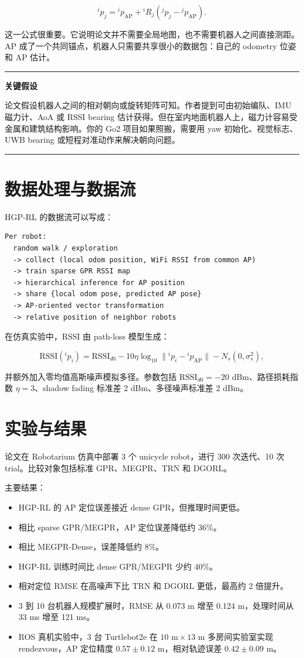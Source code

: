 \documentclass[UTF8,a4paper,12pt]{ctexrep}
\newenvironment{warnbox}[1]
{\begin{center}\begin{minipage}{0.94\linewidth}\color{deeporange}\hrule\vspace{0.6em}\textbf{#1}\par\vspace{0.4em}\color{black}}
{\vspace{0.4em}\hrule\end{minipage}\end{center}}
\begin{document}
\[
{}^{i}p_j
=
{}^{i}p_{\mathrm{AP}}
+{}^{i}R_j({}^{j}p_j-{}^{j}p_{\mathrm{AP}}).
\]

这一公式很重要。它说明论文并不需要全局地图，也不需要机器人之间直接测距。AP 成了一个共同锚点，机器人只需要共享很小的数据包：自己的 odometry 位姿和 AP 估计。

\begin{warnbox}{关键假设}
论文假设机器人之间的相对朝向或旋转矩阵可知。作者提到可由初始编队、IMU 磁力计、AoA 或 RSSI bearing 估计获得。但在室内地面机器人上，磁力计容易受金属和建筑结构影响。你的 Go2 项目如果照搬，需要用 yaw 初始化、视觉标志、UWB bearing 或短程对准动作来解决朝向问题。
\end{warnbox}

\section{数据处理与数据流}

HGP-RL 的数据流可以写成：

\begin{lstlisting}
Per robot:
  random walk / exploration
  -> collect (local odom position, WiFi RSSI from common AP)
  -> train sparse GPR RSSI map
  -> hierarchical inference for AP position
  -> share {local odom pose, predicted AP pose}
  -> AP-oriented vector transformation
  -> relative position of neighbor robots
\end{lstlisting}

在仿真实验中，RSSI 由 path-loss 模型生成：

\[
\mathrm{RSSI}({}^{i}p_i)
=
\mathrm{RSSI}_{d0}
-10\eta \log_{10}\|{}^{i}p_i-{}^{i}p_{\mathrm{AP}}\|
-N_s(0,\sigma_s^2),
\]

并额外加入零均值高斯噪声模拟多径。参数包括 \(\mathrm{RSSI}_{d0}=-20\) dBm、路径损耗指数 \(\eta=3\)、shadow fading 标准差 2 dBm、多径噪声标准差 2 dBm。

\section{实验与结果}

论文在 Robotarium 仿真中部署 3 个 unicycle robot，进行 300 次迭代、10 次 trial。比较对象包括标准 GPR、MEGPR、TRN 和 DGORL。

主要结果：

\begin{itemize}
  \item HGP-RL 的 AP 定位误差接近 dense GPR，但推理时间更低。
  \item 相比 sparse GPR/MEGPR，AP 定位误差降低约 36\%。
  \item 相比 MEGPR-Dense，误差降低约 8\%。
  \item HGP-RL 训练时间比 dense GPR/MEGPR 少约 40\%。
  \item 相对定位 RMSE 在高噪声下比 TRN 和 DGORL 更低，最高约 2 倍提升。
  \item 3 到 10 台机器人规模扩展时，RMSE 从 0.073 m 增至 0.124 m，处理时间从 33 ms 增至 121 ms。
  \item ROS 真机实验中，3 台 Turtlebot2e 在 \(10\text{ m}\times13\text{ m}\) 多房间实验室实现 rendezvous，AP 定位精度 \(0.57\pm0.12\) m，相对轨迹误差 \(0.42\pm0.09\) m。
\end{itemize}
\end{document}
